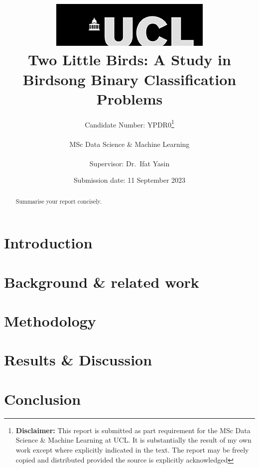\documentclass[12pt]{report}
\title{  	{ \includegraphics[scale=.5]{ucl_logo.png}}\\
{{\Huge Two Little Birds: A Study in Birdsong Binary Classification Problems}}\\
}
\date{Submission date: 11 September 2023}
\author{Candidate Number: YPDR0\thanks{
{\bf Disclaimer:}
This report is submitted as part requirement for the MSc Data Science \& Machine
Learning at UCL. It is substantially the result of my own work except where
explicitly indicated in the text. The report may be freely copied and
distributed provided the source is explicitly acknowledged
}
\\ \\
MSc Data Science \& Machine Learning\\ \\
Supervisor: Dr.\ Ifat Yasin}
\begin{document}
 
 \onehalfspacing
\maketitle
\begin{abstract}
Summarise your report concisely.
\end{abstract}
\tableofcontents
\setcounter{page}{1}


\chapter{Introduction}\label{cp:intro}


\chapter{Background \& related work}


\chapter{Methodology}


\chapter{Results \& Discussion}


\chapter{Conclusion}


\appendix



\end{document}
